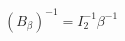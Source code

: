 \documentclass[preview]{standalone}
\begin{document}
\begin{align*}
(B_{\beta})^{-1} =   \mathit{I}_2^{-1} \beta^{-1}
\end{align*}
\end{document}
